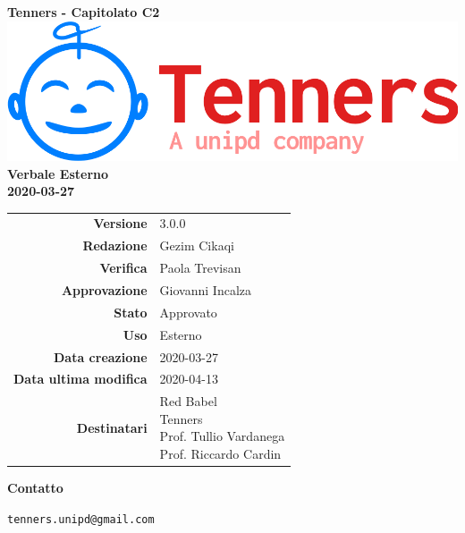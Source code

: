 \begin{titlepage}
	\begin{center}
		\large \textbf{Tenners - Capitolato C2}
		\vfill
		\includegraphics[scale = 0.3]{./res/img/logo.png}\\
		\vfill
		\Huge \textbf{Verbale Esterno} \\
		\textbf {2020-03-27}

        \vfill
        \large

        \begin{tabular}{r|l}
        	\textbf{Versione} & 3.0.0 \\
        	\textbf{Redazione} & Gezim Cikaqi \\
        	\textbf{Verifica} &  Paola Trevisan \\
        	\textbf{Approvazione} & Giovanni Incalza \\
        	\textbf{Stato} & Approvato \\
        	\textbf{Uso} &  Esterno\\
        	\textbf{Data creazione} &  2020-03-27\\
        	\textbf{Data ultima modifica} & 2020-04-13 \\
        	\textbf{Destinatari} & \parbox[t]{5cm}{Red Babel\\Tenners \\ Prof. Tullio Vardanega\\ Prof. Riccardo Cardin}
        \end{tabular}
    	\vfill
    	\normalsize
    	\vfill
    	\textbf{Contatto}

    	\texttt{tenners.unipd@gmail.com}

	\end{center}
\end{titlepage}
